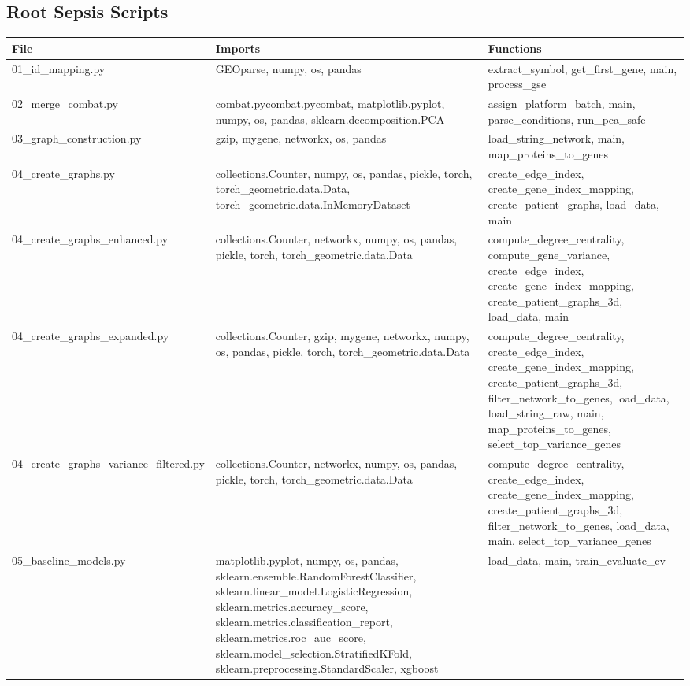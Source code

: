 \documentclass[11pt]{article}
\begin{document}
\subsection{Root Sepsis Scripts}
\begin{longtable}{p{}p{}p{}}
\textbf{File} & \textbf{Imports} & \textbf{Functions} \\ \hline
01\_id\_mapping.py & GEOparse, numpy, os, pandas & extract\_symbol, get\_first\_gene, main, process\_gse \\
02\_merge\_combat.py & combat.pycombat.pycombat, matplotlib.pyplot, numpy, os, pandas, sklearn.decomposition.PCA & assign\_platform\_batch, main, parse\_conditions, run\_pca\_safe \\
03\_graph\_construction.py & gzip, mygene, networkx, os, pandas & load\_string\_network, main, map\_proteins\_to\_genes \\
04\_create\_graphs.py & collections.Counter, numpy, os, pandas, pickle, torch, torch\_geometric.data.Data, torch\_geometric.data.InMemoryDataset & create\_edge\_index, create\_gene\_index\_mapping, create\_patient\_graphs, load\_data, main \\
04\_create\_graphs\_enhanced.py & collections.Counter, networkx, numpy, os, pandas, pickle, torch, torch\_geometric.data.Data & compute\_degree\_centrality, compute\_gene\_variance, create\_edge\_index, create\_gene\_index\_mapping, create\_patient\_graphs\_3d, load\_data, main \\
04\_create\_graphs\_expanded.py & collections.Counter, gzip, mygene, networkx, numpy, os, pandas, pickle, torch, torch\_geometric.data.Data & compute\_degree\_centrality, create\_edge\_index, create\_gene\_index\_mapping, create\_patient\_graphs\_3d, filter\_network\_to\_genes, load\_data, load\_string\_raw, main, map\_proteins\_to\_genes, select\_top\_variance\_genes \\
04\_create\_graphs\_variance\_filtered.py & collections.Counter, networkx, numpy, os, pandas, pickle, torch, torch\_geometric.data.Data & compute\_degree\_centrality, create\_edge\_index, create\_gene\_index\_mapping, create\_patient\_graphs\_3d, filter\_network\_to\_genes, load\_data, main, select\_top\_variance\_genes \\
05\_baseline\_models.py & matplotlib.pyplot, numpy, os, pandas, sklearn.ensemble.RandomForestClassifier, sklearn.linear\_model.LogisticRegression, sklearn.metrics.accuracy\_score, sklearn.metrics.classification\_report, sklearn.metrics.roc\_auc\_score, sklearn.model\_selection.StratifiedKFold, sklearn.preprocessing.StandardScaler, xgboost & load\_data, main, train\_evaluate\_cv \\

\end{longtable}
\end{document}
